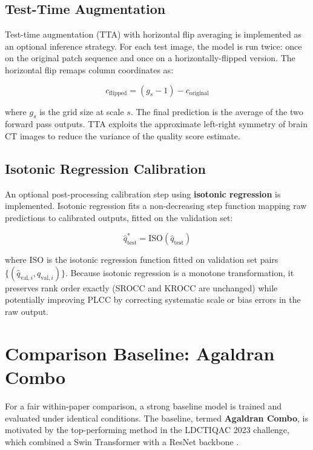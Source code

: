 \subsection{Test-Time Augmentation}

Test-time augmentation (TTA) with horizontal flip averaging is implemented as an
optional inference strategy. For each test image, the model is run twice: once on the
original patch sequence and once on a horizontally-flipped version. The horizontal flip
remaps column coordinates as:

\begin{equation}
    c_{\text{flipped}} = (g_s - 1) - c_{\text{original}}
\end{equation}

where $g_s$ is the grid size at scale $s$. The final prediction is the average of the
two forward pass outputs. TTA exploits the approximate left-right symmetry of brain CT
images to reduce the variance of the quality score estimate.

\subsection{Isotonic Regression Calibration}

An optional post-processing calibration step using \textbf{isotonic regression} is
implemented. Isotonic regression fits a non-decreasing step function mapping raw
predictions to calibrated outputs, fitted on the validation set:

\begin{equation}
    \hat{q}^*_{\text{test}} = \text{ISO}(\hat{q}_{\text{test}})
\end{equation}

where $\text{ISO}$ is the isotonic regression function fitted on validation set pairs
$\{(\hat{q}_{\text{val},i}, q_{\text{val},i})\}$. Because isotonic regression is a
monotone transformation, it preserves rank order exactly (SROCC and KROCC are unchanged)
while potentially improving PLCC by correcting systematic scale or bias errors in the
raw output.


\section{Comparison Baseline: Agaldran Combo}
\label{sec:baseline}

For a fair within-paper comparison, a strong baseline model is trained and evaluated
under identical conditions. The baseline, termed \textbf{Agaldran Combo}, is motivated
by the top-performing method in the LDCTIQAC 2023 challenge, which combined a Swin
Transformer with a ResNet backbone \cite{lee2025ldctiqac,galdran2022calibration}.


